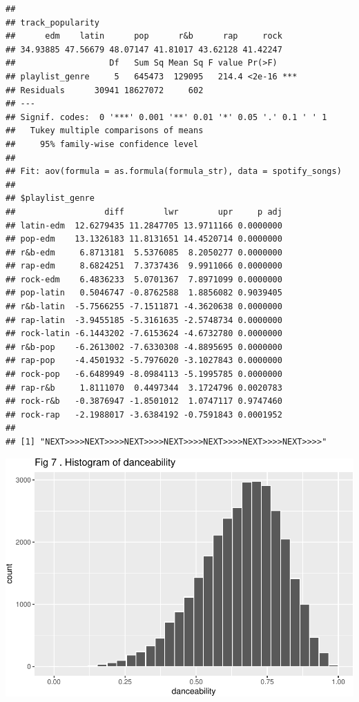 \documentclass[
]{article}
\begin{document}
\begin{verbatim}
## 
## track_popularity
##      edm    latin      pop      r&b      rap     rock 
## 34.93885 47.56679 48.07147 41.81017 43.62128 41.42247 
##                   Df   Sum Sq Mean Sq F value Pr(>F)    
## playlist_genre     5   645473  129095   214.4 <2e-16 ***
## Residuals      30941 18627072     602                   
## ---
## Signif. codes:  0 '***' 0.001 '**' 0.01 '*' 0.05 '.' 0.1 ' ' 1
##   Tukey multiple comparisons of means
##     95% family-wise confidence level
## 
## Fit: aov(formula = as.formula(formula_str), data = spotify_songs)
## 
## $playlist_genre
##                  diff        lwr        upr     p adj
## latin-edm  12.6279435 11.2847705 13.9711166 0.0000000
## pop-edm    13.1326183 11.8131651 14.4520714 0.0000000
## r&b-edm     6.8713181  5.5376085  8.2050277 0.0000000
## rap-edm     8.6824251  7.3737436  9.9911066 0.0000000
## rock-edm    6.4836233  5.0701367  7.8971099 0.0000000
## pop-latin   0.5046747 -0.8762588  1.8856082 0.9039405
## r&b-latin  -5.7566255 -7.1511871 -4.3620638 0.0000000
## rap-latin  -3.9455185 -5.3161635 -2.5748734 0.0000000
## rock-latin -6.1443202 -7.6153624 -4.6732780 0.0000000
## r&b-pop    -6.2613002 -7.6330308 -4.8895695 0.0000000
## rap-pop    -4.4501932 -5.7976020 -3.1027843 0.0000000
## rock-pop   -6.6489949 -8.0984113 -5.1995785 0.0000000
## rap-r&b     1.8111070  0.4497344  3.1724796 0.0020783
## rock-r&b   -0.3876947 -1.8501012  1.0747117 0.9747460
## rock-rap   -2.1988017 -3.6384192 -0.7591843 0.0001952
## 
## [1] "NEXT>>>>NEXT>>>>NEXT>>>>NEXT>>>>NEXT>>>>NEXT>>>>NEXT>>>>"
\end{verbatim}

\includegraphics{Final-Report_files/figure-latex/unnamed-chunk-14-3.pdf}
\end{document}
